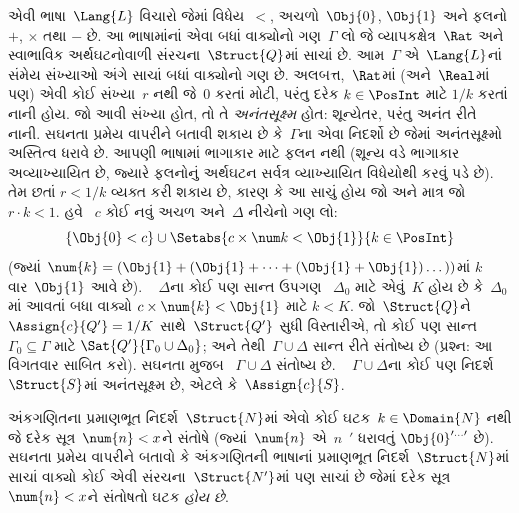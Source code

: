 \begin{ex}
એવી ભાષા~$\Lang{L}$ વિચારો જેમાં વિધેય~$<$,
અચળો~$\Obj{0}$, $\Obj{1}$ અને ફલનો $+$, $\times$ તથા
$-$ છે. આ ભાષામાંનાં એવા બધાં વાક્યોનો ગણ~$\Gamma$ લો
જે વ્યાપકક્ષેત્ર~$\Rat$ અને સ્વાભાવિક અર્થઘટનોવાળી
સંરચના~$\Struct{Q}$માં સાચાં છે. આમ~$\Gamma$ એ~$\Lang{L}$નાં
સંમેય સંખ્યાઓ અંગે સાચાં બધાં વાક્યોનો ગણ છે. અલબત્ત,~$\Rat$માં
(અને~$\Real$માં પણ) એવી કોઈ સંખ્યા~$r$ નથી જે~$0$ કરતાં મોટી, પરંતુ
દરેક $k\in\PosInt$ માટે $1/k$ કરતાં નાની હોય. જો આવી સંખ્યા હોત, તો તે
\emph{અનંતસૂક્ષ્મ} હોત: શૂન્યેતર, પરંતુ અનંત રીતે નાની. સઘનતા પ્રમેય
વાપરીને બતાવી શકાય છે કે~$\Gamma$ના એવા નિદર્શો છે જેમાં અનંતસૂક્ષ્મો
અસ્તિત્વ ધરાવે છે. આપણી ભાષામાં ભાગાકાર માટે ફલન નથી
(શૂન્ય વડે ભાગાકાર અવ્યાખ્યાયિત છે, જ્યારે ફલનોનું અર્થઘટન
સર્વત્ર વ્યાખ્યાયિત વિધેયોથી કરવું પડે છે). તેમ છતાં $r<1/k$ વ્યક્ત
કરી શકાય છે, કારણ કે આ સાચું હોય જો અને માત્ર જો $r\cdot k<1$. હવે
~$c$ કોઈ નવું અચળ અને~$\Delta$ નીચેનો ગણ લો:
\[
\{\Obj{0}<c\}
\cup \Setabs{c\times\num k<\Obj{1}}{k\in\PosInt}
\]
(જ્યાં $\num{k}=(\Obj{1}+(\Obj{1}+\dots+(\Obj{1}+\Obj{1})\dots))$માં
$k$ વાર~$\Obj{1}$ આવે છે). ~ $\Delta$ના કોઈ પણ સાન્ત ઉપગણ
~$\Delta_0$ માટે એવું~$K$ હોય છે કે~$\Delta_0$માં આવતાં બધા
વાક્યો $c\times\num{k}<\Obj{1}$ માટે $k<K$. જો~$\Struct{Q}$ને
$\Assign{c}{Q'}=1/K$ સાથે~$\Struct{Q'}$ સુધી વિસ્તારીએ, તો કોઈ પણ
સાન્ત $\Gamma_0\subseteq\Gamma$ માટે
$\Sat{Q'}{\Gamma_0\cup\Delta_0}$; અને તેથી~$\Gamma\cup\Delta$ સાન્ત
રીતે સંતોષ્ય છે (પ્રશ્ન: આ વિગતવાર સાબિત કરો). સઘનતા મુજબ
~$\Gamma\cup\Delta$ સંતોષ્ય છે. ~ $\Gamma\cup\Delta$ના કોઈ પણ નિદર્શ
~$\Struct{S}$માં અનંતસૂક્ષ્મ છે, એટલે કે~$\Assign{c}{S}$.
\end{ex}


\begin{prob}
અંકગણિતના પ્રમાણભૂત નિદર્શ~$\Struct{N}$માં એવો કોઈ
ઘટક~$k\in\Domain{N}$ નથી જે દરેક સૂત્ર~$\num{n}<x$ને સંતોષે
(જ્યાં~$\num{n}$ એ~$n$~$\prime$ ધરાવતું
$\Obj{0}^{\prime\dots\prime}$ છે). સઘનતા પ્રમેય વાપરીને બતાવો કે
અંકગણિતની ભાષાનાં પ્રમાણભૂત નિદર્શ~$\Struct{N}$માં સાચાં વાક્યો કોઈ
એવી સંરચના~$\Struct{N'}$માં પણ સાચાં છે જેમાં દરેક સૂત્ર
$\num{n}<x$ને સંતોષતો ઘટક \emph{હોય છે}.
\end{prob}


